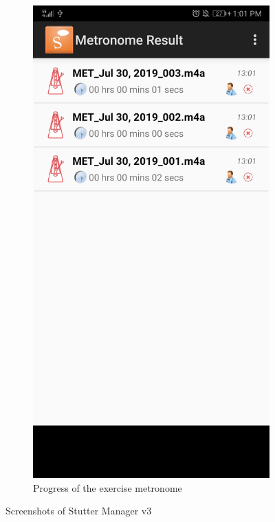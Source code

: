 \begin{appendices}
\begin{landscape}
\begin{figure}[h]
\begin{subfigure}{.25\textwidth}
    \includegraphics[width=.75\linewidth]{content/imgs/old_app_4.jpg}
    \caption{Progress of the exercise metronome}
  \end{subfigure}
  \caption*{Screenshots of Stutter Manager v3}
\end{figure}

\end{landscape}





\end{appendices}

